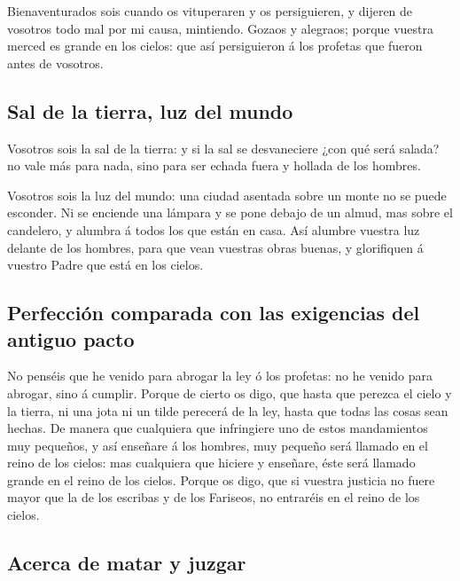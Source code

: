  Bienaventurados sois cuando os vituperaren y os
persiguieren, y dijeren de vosotros todo mal por mi causa, mintiendo.
 Gozaos y alegraos; porque vuestra merced es grande en los
cielos: que así persiguieron á los profetas que fueron antes de
vosotros.

\hypertarget{sal-de-la-tierra-luz-del-mundo}{%
\subsection{Sal de la tierra, luz del
mundo}\label{sal-de-la-tierra-luz-del-mundo}}

 Vosotros sois la sal de la tierra: y si la sal se
desvaneciere ¿con qué será salada? no vale más para nada, sino para ser
echada fuera y hollada de los hombres.

 Vosotros sois la luz del mundo: una ciudad asentada sobre
un monte no se puede esconder.  Ni se enciende una lámpara
y se pone debajo de un almud, mas sobre el candelero, y alumbra á todos
los que están en casa.  Así alumbre vuestra luz delante de
los hombres, para que vean vuestras obras buenas, y glorifiquen á
vuestro Padre que está en los cielos.

\hypertarget{perfecciuxf3n-comparada-con-las-exigencias-del-antiguo-pacto}{%
\subsection{Perfección comparada con las exigencias del antiguo
pacto}\label{perfecciuxf3n-comparada-con-las-exigencias-del-antiguo-pacto}}

 No penséis que he venido para abrogar la ley ó los
profetas: no he venido para abrogar, sino á cumplir. 
Porque de cierto os digo, que hasta que perezca el cielo y la tierra, ni
una jota ni un tilde perecerá de la ley, hasta que todas las cosas sean
hechas.  De manera que cualquiera que infringiere uno de
estos mandamientos muy pequeños, y así enseñare á los hombres, muy
pequeño será llamado en el reino de los cielos: mas cualquiera que
hiciere y enseñare, éste será llamado grande en el reino de los cielos.
 Porque os digo, que si vuestra justicia no fuere mayor que
la de los escribas y de los Fariseos, no entraréis en el reino de los
cielos.

\hypertarget{acerca-de-matar-y-juzgar}{%
\subsection{Acerca de matar y juzgar}\label{acerca-de-matar-y-juzgar}}

